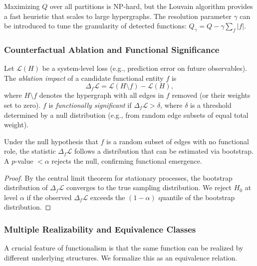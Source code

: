 \begin{lemma}
Maximizing $Q$ over all partitions is NP-hard, but the Louvain algorithm provides a fast heuristic that scales to large hypergraphs. The resolution parameter $\gamma$ can be introduced to tune the granularity of detected functions: $Q_\gamma = Q - \gamma \sum_f |f|$.
\end{lemma}

\subsubsection{Counterfactual Ablation and Functional Significance}
\begin{definition}
\label{def:ablation}
Let $\mathcal{L}(H)$ be a system-level loss (e.g., prediction error on future observables). The \emph{ablation impact} of a candidate functional entity $f$ is
\[
\Delta_f \mathcal{L} = \mathcal{L}(H \setminus f) - \mathcal{L}(H),
\]
where $H \setminus f$ denotes the hypergraph with all edges in $f$ removed (or their weights set to zero). $f$ is \emph{functionally significant} if $\Delta_f \mathcal{L} > \delta$, where $\delta$ is a threshold determined by a null distribution (e.g., from random edge subsets of equal total weight).
\end{definition}

\begin{proposition}
\label{prop:ablation}
Under the null hypothesis that $f$ is a random subset of edges with no functional role, the statistic $\Delta_f \mathcal{L}$ follows a distribution that can be estimated via bootstrap. A $p$-value $< \alpha$ rejects the null, confirming functional emergence.
\end{proposition}
\begin{proof}
By the central limit theorem for stationary processes, the bootstrap distribution of $\Delta_f \mathcal{L}$ converges to the true sampling distribution. We reject $H_0$ at level $\alpha$ if the observed $\Delta_f \mathcal{L}$ exceeds the $(1-\alpha)$ quantile of the bootstrap distribution.
\end{proof}

\subsubsection{Multiple Realizability and Equivalence Classes}
A crucial feature of functionalism is that the same function can be realized by different underlying structures. We formalize this as an equivalence relation.

